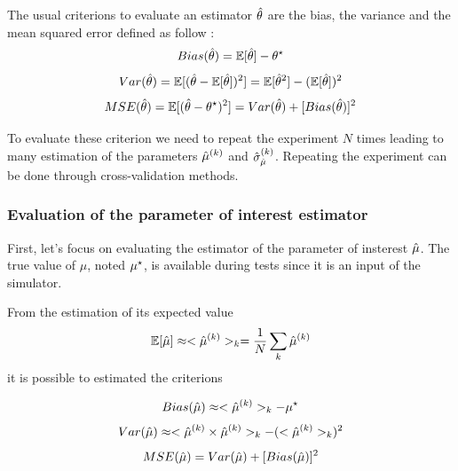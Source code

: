 The usual criterions to evaluate an estimator $\hat\theta$ are the bias, the variance and the mean squared error defined as follow :
\begin{equation}
  Bias(\hat\theta) = \mathbb{E}[\hat\theta] - \theta^\star
\end{equation}
\begin{equation}
  Var(\hat\theta) = \mathbb{E}[ (\hat\theta - \mathbb{E}[\hat\theta])^2 ] = \mathbb{E}[\hat\theta^2] - (\mathbb{E}[\hat\theta])^2
\end{equation}
\begin{equation}
  MSE(\hat\theta) = \mathbb{E}[(\hat\theta - \theta^\star)^2] = Var(\hat\theta) + [Bias(\hat\theta)]^2
\end{equation}

To evaluate these criterion we need to repeat the experiment $N$ times leading to many estimation of the parameters $\hat\mu^{(k)}$ and $\hat\sigma_{\hat\mu}^{(k)}$.
Repeating the experiment can be done through cross-validation methods.









\subsubsection{Evaluation of the parameter of interest estimator} %
\label{ssub:evaluation_of_the_parameter_of_interest_estimator}

First, let's focus on evaluating the estimator of the parameter of insterest $\hat\mu$.
The true value of $\mu$, noted $\mu^\star$, is available during tests since it is an input of the simulator.

From the estimation of its expected value
\begin{equation}
  \mathbb{E}[\hat\mu] \approx <\hat\mu^{(k)}>_k = \frac{1}{N} \sum_{k} \hat\mu^{(k)}
\end{equation}
it is possible to estimated the criterions

\begin{equation}
  Bias(\hat\mu) \approx <\hat\mu^{(k)}>_k - \mu^\star
\end{equation}
\begin{equation}
  \label{eq:var_hmu}
  Var(\hat\mu) \approx <\hat\mu^{(k)} \times \hat\mu^{(k)}>_k - (<\hat\mu^{(k)}>_k)^2
\end{equation}
\begin{equation}
  MSE(\hat\mu) = Var(\hat\mu) + [Bias(\hat\mu)]^2
\end{equation}









